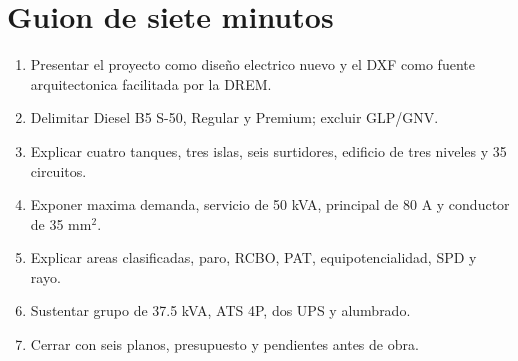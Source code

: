 \documentclass[12pt,letterpaper]{report}
\begin{document}
\section*{Guion de siete minutos}
\begin{enumerate}
\item Presentar el proyecto como diseño electrico nuevo y el DXF como fuente arquitectonica facilitada por la DREM.
\item Delimitar Diesel B5 S-50, Regular y Premium; excluir GLP/GNV.
\item Explicar cuatro tanques, tres islas, seis surtidores, edificio de tres niveles y 35 circuitos.
\item Exponer maxima demanda, servicio de 50 kVA, principal de 80 A y conductor de 35 mm$^2$.
\item Explicar areas clasificadas, paro, RCBO, PAT, equipotencialidad, SPD y rayo.
\item Sustentar grupo de 37.5 kVA, ATS 4P, dos UPS y alumbrado.
\item Cerrar con seis planos, presupuesto y pendientes antes de obra.
\end{enumerate}
\end{document}
